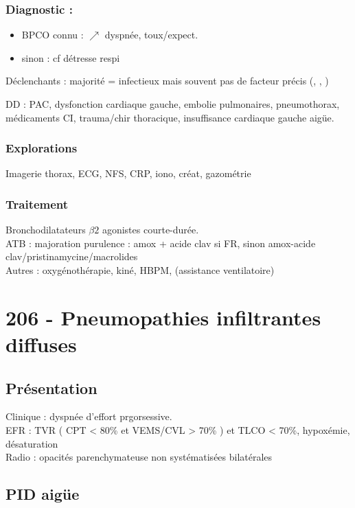 \subsubsection{Diagnostic :}
\begin{itemize}
\item BPCO connu : \(\nearrow\) dyspnée, toux/expect.
\item sinon : cf détresse respi
\end{itemize}

Déclenchants : majorité = infectieux mais souvent pas de facteur précis
(, , )

DD : PAC, dysfonction cardiaque gauche, embolie pulmonaires, pneumothorax, médicaments CI, trauma/chir thoracique, insuffisance cardiaque gauche aigüe.

\subsubsection{Explorations}
Imagerie thorax, ECG, NFS, CRP, iono, créat, gazométrie

\subsubsection{Traitement}
Bronchodilatateurs $\beta2$ agonistes courte-durée.\\
ATB : majoration purulence : amox + acide clav si FR, sinon amox-acide
clav/pristinamycine/macrolides\\
Autres \faHospitalO : oxygénothérapie, kiné, HBPM, (assistance ventilatoire)

\section{206 - Pneumopathies infiltrantes diffuses}
\subsection{Présentation}
Clinique : dyspnée d'effort prgorsessive.\\
EFR : \gls{TVR} ( CPT < 80\% et VEMS/CVL >
70\% ) et TLCO < 70\%, hypoxémie, désaturation\\
Radio : opacités parenchymateuse non systématisées bilatérales

\subsection{PID aigüe}
